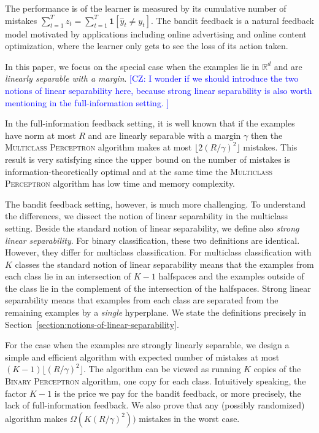 \documentclass[12pt]{article}
\newcommand{\R}{\mathbb{R}}  %
\newcommand{\indicator}[1]{\mathbf{1}\left[#1 \right]} %
\newcommand{\kibitz}[2]{{\textcolor{#1}{\textsf{\footnotesize #2}}}}
\newcommand{\chicheng}[1]{\kibitz{blue}{[CZ: #1]}}
\begin{document}
The performance is of the learner is measured by its cumulative number of mistakes
$\sum_{t=1}^T z_t = \sum_{t=1}^T \indicator{\widehat y_t \neq y_t}$. The bandit feedback
 is a natural feedback model motivated by applications including
online advertising and online content optimization, where the learner only gets to
see the loss of its action taken.

In this paper, we focus on the special case when the examples lie in $\R^d$ and
are \emph{linearly separable with a margin}.
\chicheng{I wonder if we should introduce the two notions of linear separability here,
because strong linear separability is also worth mentioning in the full-information setting.
}

In the full-information feedback
setting, it is well known that if the examples have norm at most $R$ and are
linearly separable with a margin $\gamma$ then the \textsc{Multiclass
Perceptron} algorithm makes at most $\lfloor 2(R/\gamma)^2 \rfloor$ mistakes.
This result is very satisfying since the upper bound on the number of mistakes
is information-theoretically optimal and at the same time the \textsc{Multiclass
Perceptron} algorithm has low time and memory complexity.

The bandit feedback setting, however, is much more challenging. To understand
the differences, we dissect the notion of linear separability in the multiclass
setting. Beside the standard notion of linear separability, we define also
\emph{strong linear separability}. For binary classification, these two
definitions are identical. However, they differ for multiclass classification.
For multiclass classification with $K$ classes the standard notion of linear
separability means that the examples from each class lie in an intersection of
$K-1$ halfspaces and the examples outside of the class lie in the complement of
the intersection of the halfspaces. Strong linear separability means that
examples from each class are separated from the remaining examples by a
\emph{single} hyperplane. We state the definitions precisely in
Section~\ref{section:notions-of-linear-separability}.

For the case when the examples are strongly linearly separable, we design a
simple and efficient algorithm with expected number of mistakes at most $(K-1)
\lfloor (R/\gamma)^2 \rfloor$. The algorithm can be viewed as running $K$ copies
of the \textsc{Binary Perceptron} algorithm, one copy for each class.
Intuitively speaking, the factor $K-1$ is the price we pay for the bandit
feedback, or more precisely, the lack of full-information feedback. We also
prove that any (possibly randomized) algorithm makes $\Omega(K (R/\gamma)^2))$
mistakes in the worst case.
\end{document}
